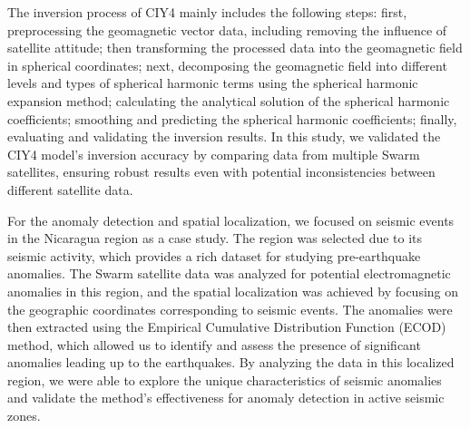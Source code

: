\documentclass[3p,authoryear,preprint,12pt]{elsarticle}
\begin{document}
{The inversion process of CIY4 mainly includes the following steps: first, preprocessing the geomagnetic vector data, including removing the influence of satellite attitude; then transforming the processed data into the geomagnetic field in spherical coordinates; next, decomposing the geomagnetic field into different levels and types of spherical harmonic terms using the spherical harmonic expansion method; calculating the analytical solution of the spherical harmonic coefficients; smoothing and predicting the spherical harmonic coefficients; finally, evaluating and validating the inversion results. In this study, we validated the CIY4 model's inversion accuracy by comparing data from multiple Swarm satellites, ensuring robust results even with potential inconsistencies between different satellite data.}

{For the anomaly detection and spatial localization, we focused on seismic events in the Nicaragua region as a case study. The region was selected due to its seismic activity, which provides a rich dataset for studying pre-earthquake anomalies. The Swarm satellite data was analyzed for potential electromagnetic anomalies in this region, and the spatial localization was achieved by focusing on the geographic coordinates corresponding to seismic events. The anomalies were then extracted using the Empirical Cumulative Distribution Function (ECOD) method, which allowed us to identify and assess the presence of significant anomalies leading up to the earthquakes. By analyzing the data in this localized region, we were able to explore the unique characteristics of seismic anomalies and validate the method's effectiveness for anomaly detection in active seismic zones.}
\end{document}
